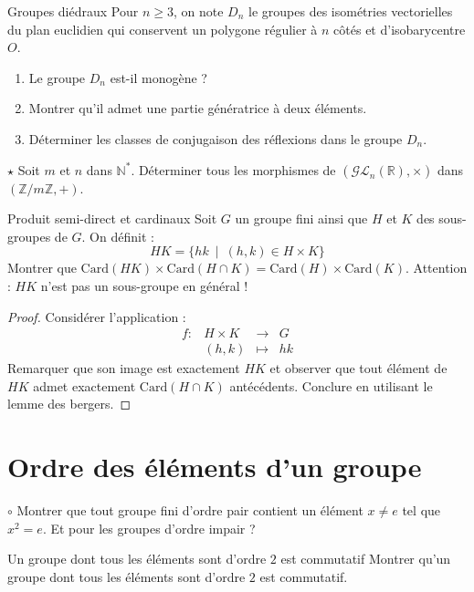 \documentclass[french,a4paper]{article}
\newcommand{\N}{\mathbb{N}}
\newcommand{\Z}{\mathbb{Z}}
\newcommand{\R}{\mathbb{R}}
\newcommand{\st}{^*}
\newcommand{\card}{\text{Card}}
\theoremstyle{plain}
\theoremstyle{definition}
\theoremstyle{remark}
\begin{document}
\begin{ex}[Moulin.AG.16]{Groupes diédraux}
	Pour $n\geqslant 3$, on note $D_n$ le groupes des isométries vectorielles du plan euclidien qui conservent un polygone régulier à $n$ côtés et d'isobarycentre $O$.
	\begin{enumerate}
		\item Le groupe $D_n$ est-il monogène ?
		\item Montrer qu'il admet une partie génératrice à deux éléments.
		\item Déterminer les classes de conjugaison des réflexions dans le groupe $D_n$.
	\end{enumerate}
\end{ex}

\begin{ex}[Moulin.AG.17]{$\star$}
	Soit $m$ et $n$ dans $\N\st$. Déterminer tous les morphismes de $(\mathcal{GL}_n(\R),\times)$ dans $(\Z/m\Z,+)$.
\end{ex}

\begin{ex}{Produit semi-direct et cardinaux}
	Soit $G$ un groupe fini ainsi que $H$ et $K$ des sous-groupes de $G$. On définit : $$HK=\{hk\ \mid \ (h,k)\in H\times K\}$$ Montrer que $\card(HK)\times\card(H\cap K)=\card(H)\times\card(K)$. Attention : $HK$ n'est pas un sous-groupe en général !
\end{ex}

\begin{proof}
	Considérer l'application : $$\begin{array}{lrcl}
		f:&H\times K&\longrightarrow&G \\
		&(h,k)&\longmapsto&hk
	\end{array}$$ Remarquer que son image est exactement $HK$ et observer que tout élément de $HK$ admet exactement $\card(H\cap K)$ antécédents. Conclure en utilisant le lemme des bergers.
\end{proof}

\section{Ordre des éléments d'un groupe}

\begin{ex}[Moulin.AG.18]{$\circ$}
	Montrer que tout groupe fini d'ordre pair contient un élément $x\ne e$ tel que $x^2=e$. Et pour les groupes d'ordre impair ?
\end{ex}

\begin{ex}{Un groupe dont tous les éléments sont d'ordre $2$ est commutatif}
	Montrer qu'un groupe dont tous les éléments sont d'ordre $2$ est commutatif.
\end{ex}
\end{document}
